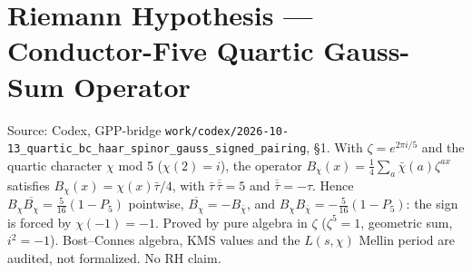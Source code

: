 \documentclass{report}
\theoremstyle{definition}
\begin{document}
\section{Riemann Hypothesis --- Conductor-Five Quartic Gauss-Sum Operator}
Source: Codex, GPP-bridge \texttt{work/codex/2026-10-13\_quartic\_bc\_haar\_spinor\_gauss\_signed\_pairing}, \S1. With $\zeta=e^{2\pi i/5}$ and the quartic character $\chi$ mod 5 ($\chi(2)=i$), the operator $B_\chi(x)=\tfrac14\sum_a\bar\chi(a)\zeta^{ax}$ satisfies $B_\chi(x)=\chi(x)\bar\tau/4$, with $\bar\tau\,\overline{\bar\tau}=5$ and $\overline{\bar\tau}=-\tau$. Hence $B_\chi\overline{B_\chi}=\tfrac5{16}(1-P_5)$ pointwise, $\overline{B_\chi}=-B_{\bar\chi}$, and $B_\chi B_{\bar\chi}=-\tfrac5{16}(1-P_5)$: the sign is forced by $\chi(-1)=-1$. Proved by pure algebra in $\zeta$ ($\zeta^5=1$, geometric sum, $i^2=-1$). Bost--Connes algebra, KMS values and the $L(s,\chi)$ Mellin period are audited, not formalized. No RH claim.
\end{document}
